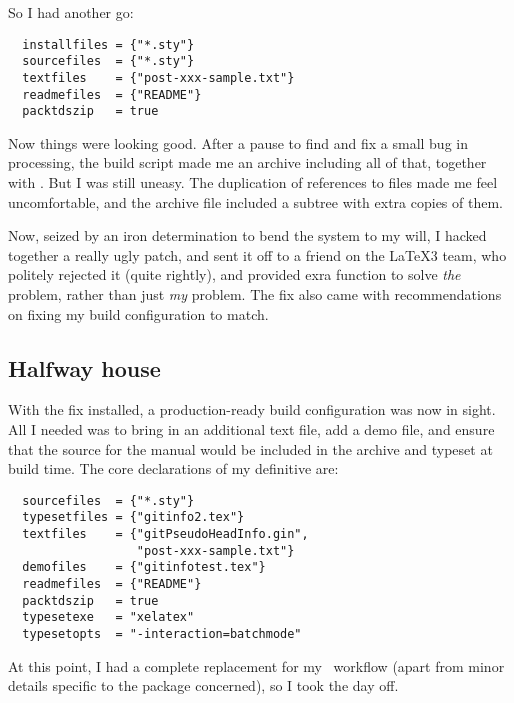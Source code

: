 So I had another go:

\begin{verbatim}
  installfiles = {"*.sty"}
  sourcefiles  = {"*.sty"}
  textfiles    = {"post-xxx-sample.txt"}
  readmefiles  = {"README"}
  packtdszip   = true
\end{verbatim}

Now things were looking good.
After a pause to find and fix a small bug in
 processing,
the build script made me an archive including all of that,
together with .
But I was still uneasy.
The duplication of references to  files
made me feel uncomfortable,
and the archive  file included
a  subtree with extra copies of them.

Now, seized by an iron determination to bend the system to my will,
I hacked together a really ugly patch,
and sent it off to a friend on the \LaTeX3 team,
who politely rejected it (quite rightly),
and provided exra function to solve \emph{the} problem,
rather than just \emph{my} problem.
The fix also came with recommendations
on fixing my build configuration to match.

\subsection{Halfway house}
\label{sec:halfway-house}

With the fix installed, a production-ready
build configuration was now in sight.
All I needed was to bring in an additional text file,
add a demo  file,
and ensure that the source for the manual would be
included in the archive and typeset at build time.
The core declarations of my definitive  are:

\begin{verbatim}
  sourcefiles  = {"*.sty"}
  typesetfiles = {"gitinfo2.tex"}
  textfiles    = {"gitPseudoHeadInfo.gin",
                  "post-xxx-sample.txt"}
  demofiles    = {"gitinfotest.tex"}
  readmefiles  = {"README"}
  packtdszip   = true
  typesetexe   = "xelatex"
  typesetopts  = "-interaction=batchmode"
\end{verbatim}

At this point,
I had a complete replacement for
my \CTAN\ workflow
(apart from minor details specific to
the package concerned),
so I took the day off.

